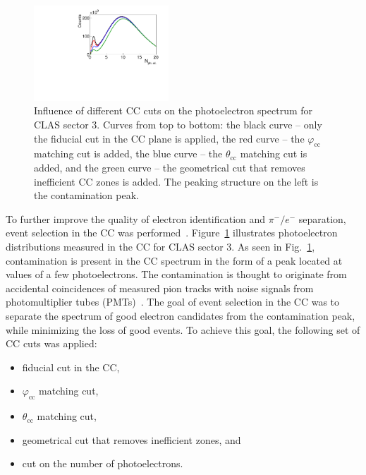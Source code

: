 \documentclass[prc,twocolumn,superscriptaddress,showpacs,amssymb,amsmath,amsfonts,aps,nofootinbib]{revtex4-1}
\begin{document}
\begin{figure}[htp]
\begin{center}
 \includegraphics[width=0.45\textwidth,keepaspectratio]{pictures/event_selection/photoel.pdf}
\caption{Influence of different CC cuts on the photoelectron spectrum for CLAS sector 3. Curves from top to bottom: the black curve -- only the fiducial cut in the CC plane is applied, the red curve -- the $\varphi_{\text{cc}}$ matching cut is added, the blue curve -- the $\theta_{\text{cc}}$ matching cut is added, and the green curve -- the geometrical cut that removes inefficient CC zones is added. The peaking structure on the left is the contamination peak.}
\label{fig:photoel}
\end{center}
\end{figure}


To further improve the quality of electron identification and $\pi^{-}/e^{-}$ separation, event selection in the CC was performed~\cite{Adams:2001kk}. Figure~\ref{fig:photoel} illustrates photoelectron distributions measured in the CC for CLAS sector 3.  As seen in Fig.\!~\ref{fig:photoel}, contamination is present in the CC spectrum in the form of a peak located at values of a few photoelectrons. The contamination is thought to originate from accidental coincidences of measured pion tracks with noise signals from photomultiplier tubes (PMTs)~\cite{Osipenko:2004}. The goal of event selection in the CC was to separate the spectrum of good electron candidates from the contamination peak, while minimizing the loss of good events. To achieve this goal, the following set of CC cuts was applied: 

\begin{itemize}
\item fiducial cut in the CC,
\item $\varphi_{\text{cc}}$ matching cut,
\item $\theta_{\text{cc}}$ matching cut,
\item geometrical cut that removes inefficient zones, and
\item cut on the number of photoelectrons.
\end{itemize}
\end{document}
